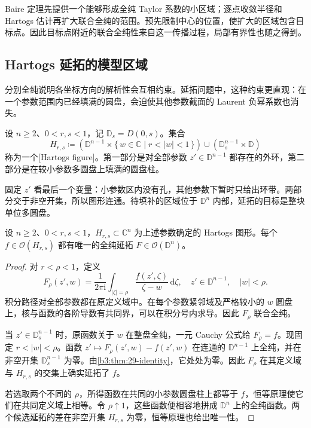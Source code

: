 Baire 定理先提供一个能够形成全纯 Taylor 系数的小区域；逐点收敛半径和 Hartogs 估计再扩大联合全纯的范围。预先限制中心的位置，使扩大的区域包含目标点。因此目标点附近的联合全纯性来自这一传播过程，局部有界性也随之得到。

\subsection{Hartogs 延拓的模型区域}
\label{b3:subsec:290202}

分别全纯说明各坐标方向的解析性会互相约束。延拓问题中，这种约束更直观：在一个参数范围内已经填满的圆盘，会迫使其他参数截面的 Laurent 负幂系数也消失。

\begin{definition}\label{b3:def:29-hartogs-figure}
设 \(n\ge2\)、\(0<r,s<1\)，记 \(\mathbb D_s=D(0,s)\)。集合
\[
 H_{r,s}\coloneqq
 \left(\mathbb D^{n-1}\times\{\,w\in\mathbb C\mid r<|w|<1\,\}\right)
 \cup\left(\mathbb D_s^{n-1}\times\mathbb D\right)
\]
称为一个[Hartogs figure]。第一部分是对全部参数 \(z'\in\mathbb D^{n-1}\) 都存在的外环，第二部分是在较小参数多圆盘上填满的圆盘柱。
\end{definition}

固定 \(z'\) 看最后一个变量：小参数区内没有孔，其他参数下暂时只给出环带。两部分交于非空开集，所以图形连通。待填补的区域位于 \(\mathbb D^n\) 内部，延拓的目标是整块单位多圆盘。

\begin{theorem}\label{b3:thm:29-hartogs-figure}
设 \(n\ge2\)、\(0<r,s<1\)，\(H_{r,s}\subset\mathbb C^n\) 为上述参数确定的 Hartogs 图形。每个 \(f\in\mathcal O(H_{r,s})\) 都有唯一的全纯延拓 \(F\in\mathcal O(\mathbb D^n)\)。
\end{theorem}
\begin{proof}
对 \(r<\rho<1\)，定义
\[
 F_\rho(z',w)=\frac1{2\pi\mathrm{i}}
 \int_{|\zeta|=\rho}\frac{f(z',\zeta)}{\zeta-w}\,\mathrm{d}\zeta,
 \quad z'\in\mathbb D^{n-1},\quad |w|<\rho.
\]
积分路径对全部参数都在原定义域中。在每个参数紧邻域及严格较小的 \(w\) 圆盘上，核与函数的各阶导数有共同界，可以在积分号内求导。因此 \(F_\rho\) 联合全纯。

当 \(z'\in\mathbb D_s^{n-1}\) 时，原函数关于 \(w\) 在整盘全纯，一元 Cauchy 公式给 \(F_\rho=f\)。现固定 \(r<|w|<\rho\)。函数 \(z'\mapsto F_\rho(z',w)-f(z',w)\) 在连通的 \(\mathbb D^{n-1}\) 上全纯，并在非空开集 \(\mathbb D_s^{n-1}\) 为零。由\cref{b3:thm:29-identity}，它处处为零。因此 \(F_\rho\) 在其定义域与 \(H_{r,s}\) 的交集上确实延拓了 \(f\)。

若选取两个不同的 \(\rho\)，所得函数在共同的小参数圆盘柱上都等于 \(f\)，恒等原理使它们在共同定义域上相等。令 \(\rho\uparrow1\)，这些函数便相容地拼成 \(\mathbb D^n\) 上的全纯函数。两个候选延拓的差在非空开集 \(H_{r,s}\) 为零，恒等原理也给出唯一性。
\end{proof}

